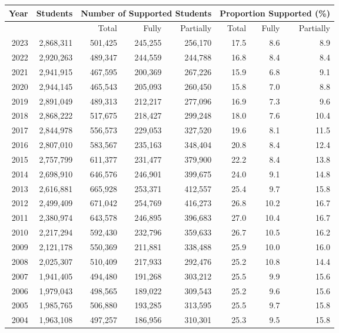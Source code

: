 \begin{table}
\renewcommand{\arraystretch}{1.25}
\small
\centering
\begin{tabular}{rrrrrrrr}
\toprule
Year & Students & \multicolumn{3}{|c|}{Number of Supported Students} & \multicolumn{3}{c}{Proportion Supported (\%)} \\
\midrule
 & & Total & Fully & Partially & Total & Fully & Partially \\
\midrule
2023 & 2,868,311 & 501,425 & 245,255 & 256,170 & 17.5 & 8.6 & 8.9 \\
2022 & 2,920,263 & 489,347 & 244,559 & 244,788 & 16.8 & 8.4 & 8.4 \\
2021 & 2,941,915 & 467,595 & 200,369 & 267,226 & 15.9 & 6.8 & 9.1 \\
2020 & 2,944,145 & 465,543 & 205,093 & 260,450 & 15.8 & 7.0 & 8.8 \\
2019 & 2,891,049 & 489,313 & 212,217 & 277,096 & 16.9 & 7.3 & 9.6 \\
2018 & 2,868,222 & 517,675 & 218,427 & 299,248 & 18.0 & 7.6 & 10.4 \\
2017 & 2,844,978 & 556,573 & 229,053 & 327,520 & 19.6 & 8.1 & 11.5 \\
2016 & 2,807,010 & 583,567 & 235,163 & 348,404 & 20.8 & 8.4 & 12.4 \\
2015 & 2,757,799 & 611,377 & 231,477 & 379,900 & 22.2 & 8.4 & 13.8 \\
2014 & 2,698,910 & 646,576 & 246,901 & 399,675 & 24.0 & 9.1 & 14.8 \\
2013 & 2,616,881 & 665,928 & 253,371 & 412,557 & 25.4 & 9.7 & 15.8 \\
2012 & 2,499,409 & 671,042 & 254,769 & 416,273 & 26.8 & 10.2 & 16.7 \\
2011 & 2,380,974 & 643,578 & 246,895 & 396,683 & 27.0 & 10.4 & 16.7 \\
2010 & 2,217,294 & 592,430 & 232,796 & 359,633 & 26.7 & 10.5 & 16.2 \\
2009 & 2,121,178 & 550,369 & 211,881 & 338,488 & 25.9 & 10.0 & 16.0 \\
2008 & 2,025,307 & 510,409 & 217,933 & 292,476 & 25.2 & 10.8 & 14.4 \\
2007 & 1,941,405 & 494,480 & 191,268 & 303,212 & 25.5 & 9.9 & 15.6 \\
2006 & 1,979,043 & 498,565 & 189,022 & 309,543 & 25.2 & 9.6 & 15.6 \\
2005 & 1,985,765 & 506,880 & 193,285 & 313,595 & 25.5 & 9.7 & 15.8 \\
2004 & 1,963,108 & 497,257 & 186,956 & 310,301 & 25.3 & 9.5 & 15.8 \\

\end{tabular}
\end{table}
